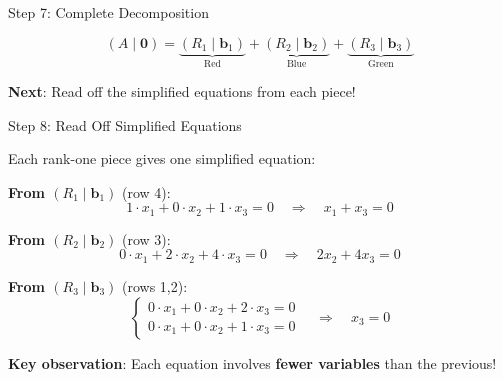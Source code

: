\documentclass[10pt]{beamer}
\theoremstyle{definition}
\newcommand{\x}[1]{\alert{\textbf{#1}}}
\begin{document}
\begin{frame}[fragile]{Step 7: Complete Decomposition}
\vspace{1em}

$$(A \mid \mathbf{0}) = \underbrace{(R_1 \mid \mathbf{b}_1)}_{\text{Red}} + \underbrace{(R_2 \mid \mathbf{b}_2)}_{\text{Blue}} + \underbrace{(R_3 \mid \mathbf{b}_3)}_{\text{Green}}$$

\vspace{0.5em}

\x{Next}: Read off the simplified equations from each piece!

\end{frame}

\begin{frame}{Step 8: Read Off Simplified Equations}

Each rank-one piece gives one simplified equation:

\vspace{1em}

\x{From $(R_1 \mid \mathbf{b}_1)$} (row 4):
$$1 \cdot x_1 + 0 \cdot x_2 + 1 \cdot x_3 = 0 \quad \Rightarrow \quad \boxed{x_1 + x_3 = 0}$$

\vspace{0.5em}

\x{From $(R_2 \mid \mathbf{b}_2)$} (row 3):
$$0 \cdot x_1 + 2 \cdot x_2 + 4 \cdot x_3 = 0 \quad \Rightarrow \quad \boxed{2x_2 + 4x_3 = 0}$$

\vspace{0.5em}

\x{From $(R_3 \mid \mathbf{b}_3)$} (rows 1,2):
$$\begin{cases}
0 \cdot x_1 + 0 \cdot x_2 + 2 \cdot x_3 = 0 \\
0 \cdot x_1 + 0 \cdot x_2 + 1 \cdot x_3 = 0
\end{cases} \quad \Rightarrow \quad \boxed{x_3 = 0}$$

\vspace{1em}

\x{Key observation}: Each equation involves \textbf{fewer variables} than the previous!

\end{frame}
\end{document}
